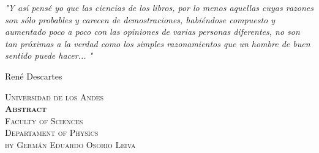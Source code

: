 \documentclass[11pt]{book}
\theoremstyle{definition}
\begin{document}

\thispagestyle{empty}
\vspace*{8em}
\textit{"Y así pensé yo que las ciencias de los libros, por lo menos aquellas cuyas razones son sólo probables y carecen de demostraciones, habiéndose compuesto y aumentado poco a poco con las opiniones de varias personas diferentes, no son tan próximas a la verdad como los simples razonamientos que un hombre de buen sentido puede hacer... "}
\begin{flushright}
René Descartes
\end{flushright}








 






\pagestyle{empty}
\frontmatter
\begin{center}
\vspace*{5em}
\textsc{\normalsize Universidad de los Andes}\\[1em]

\textsc{\large \textbf{Abstract}}\\[1em]

\textsc{\normalsize Faculty of Sciences}\\[1em]

\textsc{\normalsize Departament of Physics}\\[1em]

\textsc{\small by Germán Eduardo Osorio Leiva}
\end{center}
\end{document}
